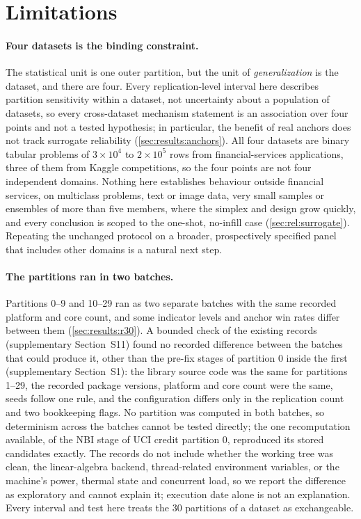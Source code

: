 \section{Limitations}
\label{sec:limitations}

\paragraph{Four datasets is the binding constraint.} The statistical unit is one outer partition, but the unit of
\emph{generalization} is the dataset, and there are four. Every replication-level interval here describes partition
sensitivity within a dataset, not uncertainty about a population of datasets, so every cross-dataset mechanism
statement is an association over four points and not a tested hypothesis; in particular, the benefit of real anchors
does not track surrogate reliability (\cref{sec:results:anchors}). All four datasets are binary tabular problems of
$3\times10^{4}$ to $2\times10^{5}$ rows from financial-services applications, three of them from Kaggle competitions,
so the four points are not four independent domains. Nothing here establishes behaviour outside financial services,
on multiclass problems, text or image data, very small samples or ensembles of more than five members, where the
simplex and design grow quickly, and every conclusion is scoped to the one-shot, no-infill case
(\cref{sec:rel:surrogate}). Repeating the unchanged protocol on a broader, prospectively specified panel that includes
other domains is a natural next step.

\paragraph{The partitions ran in two batches.} Partitions 0--9 and 10--29 ran as two separate batches with the same recorded
platform and core count, and some indicator levels and anchor win rates differ between them (\cref{sec:results:r30}). A bounded
check of the existing records (supplementary Section~S11) found no recorded difference between the batches that could produce it, other than the pre-fix
stages of partition 0 inside the first (supplementary Section~S1): the
library source code was the same for partitions 1--29, the recorded package versions, platform and core count were
the same, seeds follow one rule, and the configuration differs only in the replication count and two bookkeeping
flags. No partition was computed in both batches, so determinism across the batches cannot be tested directly; the
one recomputation available, of the NBI stage of UCI credit partition 0, reproduced its stored candidates exactly.
The records do not include whether the working tree was clean, the linear-algebra backend, thread-related
environment variables, or the machine's power, thermal state and concurrent load, so we report the difference as
exploratory and cannot explain it; execution date alone is not an explanation. Every interval and test here treats
the 30 partitions of a dataset as exchangeable.

